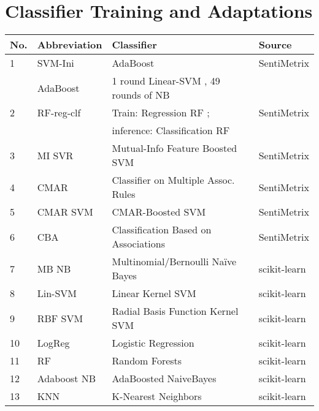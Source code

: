 \chapter{Classifier Training and Adaptations}\label{sec:ml}

\begin{table}[t]
{\small
    \centering
    \begin{tabular}{|l|l|l|l|}
    \hline
    \textsf{No.}& \textsf{Abbreviation} & \textsf{Classifier} & \textsf{Source}\\
    \hline
    1 & \textsf{SVM-Ini}& \textsf{AdaBoost \cite{adaboost} \cite{scikit-learn}} & \textsf{SentiMetrix} \\
      & \textsf{AdaBoost} & \textsf{1 round Linear-SVM \cite{cortes95}},  49 rounds of NB  & \\
    2 & \textsf{RF-reg-clf} & \textsf{Train: Regression RF \cite{ho95}}; & \textsf{SentiMetrix} \\
      & & \textsf{inference: Classification RF} & \\
    3 &\textsf{MI SVR}&  \textsf{Mutual-Info \cite{ross14} Feature Boosted SVM \cite{cortes95}} & \textsf{SentiMetrix} \\
    4 & \textsf{CMAR} &  \textsf{Classifier on Multiple Assoc. Rules \cite{cmar}}& \textsf{SentiMetrix} \\
    5 & \textsf{CMAR SVM}& \textsf{CMAR-Boosted \cite{cmar} SVM \cite{cortes95}}& \textsf{SentiMetrix} \\
    6 & \textsf{CBA} & \textsf{Classification Based on Associations \cite{cba}}& \textsf{SentiMetrix} \\
    \hline
    7 & \textsf{MB NB} & \textsf{Multinomial/Bernoulli Na\"{i}ve Bayes \cite{scikit-learn}} & \textsf{scikit-learn} \\
    8 & \textsf{Lin-SVM}& \textsf{Linear Kernel SVM \cite{cortes95}} & \textsf{scikit-learn} \\
    9 & \textsf{RBF SVM}& \textsf{Radial Basis Function Kernel SVM \cite{scikit-learn}} & \textsf{scikit-learn} \\
    10 & \textsf{LogReg} & \textsf{Logistic Regression \cite{scikit-learn}} & \textsf{scikit-learn}\\
    11 & \textsf{RF} & \textsf{Random Forests \cite{ho95}} & \textsf{scikit-learn} \\
    12 &  \textsf{Adaboost NB}& \textsf{AdaBoosted NaiveBayes \cite{adaboost}}& \textsf{scikit-learn} \\
    13 &  \textsf{KNN} & \textsf{K-Nearest Neighbors \cite{scikit-learn}} & \textsf{scikit-learn} \\

\end{tabular}}
\end{table}
